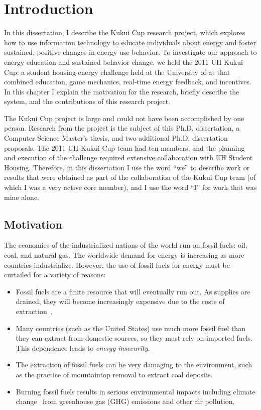 \chapter{Introduction}

In this dissertation, I describe the Kukui Cup research project, which explores how to use information technology to educate individuals about energy and foster sustained, positive changes in energy use behavior. To investigate our approach to energy education and sustained behavior change, we held the 2011 UH Kukui Cup: a student housing energy challenge held at the University of \Hawaii at \Manoa that combined education, game mechanics, real-time energy feedback, and incentives. In this chapter I explain the motivation for the research, briefly describe the system, and the contributions of this research project.

The Kukui Cup project is large and could not have been accomplished by one person. Research from the project is the subject of this Ph.D. dissertation, a Computer Science Master's thesis, and two additional Ph.D. dissertation proposals. The 2011 UH Kukui Cup team had ten members, and the planning and execution of the challenge required extensive collaboration with UH \Manoa Student Housing. Therefore, in this dissertation I use the word ``we'' to describe work or results that were obtained as part of the collaboration of the Kukui Cup team (of which I was a very active core member), and I use the word ``I'' for work that was mine alone.


\section{Motivation}

The economies of the industrialized nations of the world run on fossil fuels: oil, coal, and natural gas. The worldwide demand for energy is increasing as more countries industrialize. However, the use of fossil fuels for energy must be curtailed for a variety of reasons:

\begin{itemize}
	\item Fossil fuels are a finite resource that will eventually run out. As supplies are drained, they will become increasingly expensive due to the costs of extraction~\cite{Murray2012Climate-policy}.
	\item Many countries (such as the United States) use much more fossil fuel than they can extract from domestic sources, so they must rely on imported fuels. This dependence leads to \emph{energy insecurity}.
	\item The extraction of fossil fuels can be very damaging to the environment, such as the practice of mountaintop removal to extract coal deposits.
	\item Burning fossil fuels results in serious environmental impacts including climate change~\cite{IPCC-synthesis-report-2007} from greenhouse gas (GHG) emissions and other air pollution.
\end{itemize}

